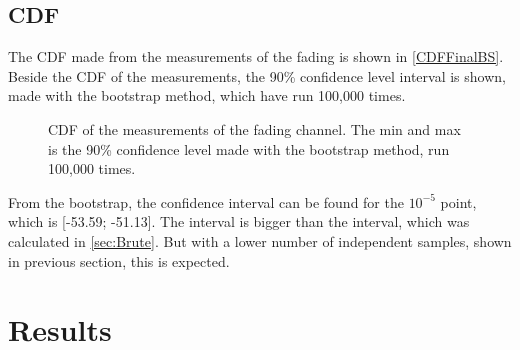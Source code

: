 \subsection{CDF}
The CDF made from the measurements of the fading is shown in \autoref{CDFFinalBS}. Beside the CDF of the measurements, the 90\% confidence level interval is shown, made with the bootstrap method, which have run 100,000 times.

\begin{figure}[H]

\caption{CDF of the measurements of the fading channel. The min and max is the 90\% confidence level made with the bootstrap method, run 100,000 times.}
\label{CDFFinalBS}
\end{figure}

From the bootstrap, the confidence interval can be found for the $10^{-5}$ point, which is [-53.59; -51.13]. The interval is bigger than the interval, which was calculated in \autoref{sec:Brute}. But with a lower number of independent samples, shown in previous section, this is expected.

\section{Results}